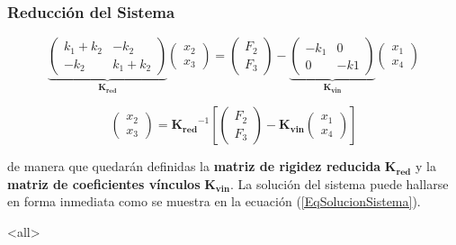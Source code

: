   \begin{frame}[label=FrameSistemaReducido]
    \frametitle<presentation>{Reducción del Sistema}
    \begin{equation}\label{EqSistemaReducido}
      \underbrace{
	\begin{pmatrix} k_1 + k_2 & - k_2 \\ -k_2 & k_1 + k_2 \end{pmatrix}
	}_{ \mathbf{K_{red} } }
	\begin{pmatrix}x_2 \\ x_3\end{pmatrix}
	  = 
	  \begin{pmatrix}F_2 \\ F_3\end{pmatrix}
	    -
	  \underbrace{
	      \begin{pmatrix} -k_1 & 0 \\ 0 & -k1 \end{pmatrix}
	   }_{ \mathbf{ K_{vin} } }
	\begin{pmatrix}x_1 \\ x_4\end{pmatrix}
    \end{equation}

    \begin{equation} \label{EqSolucionSistema}
      \begin{pmatrix} x_2 \\ x_3  \end{pmatrix}
	=
	\mathbf{K_{red}} ^{-1} 
	\left[
      \begin{pmatrix} F_2 \\ F_3  \end{pmatrix}
	- 
	\mathbf{ K_{vin} }
      \begin{pmatrix} x_1 \\ x_4  \end{pmatrix}
	\right]
    \end{equation}

  \end{frame}


de manera que quedarán definidas la \textbf{matriz de rigidez reducida} $\mathbf{K_{red} }$ y la
\textbf{matriz de coeficientes vínculos} $\mathbf{K_{vin}}$. La solución del sistema puede
hallarse en forma inmediata como se muestra en la ecuación (\ref{EqSolucionSistema}).

\mode*

\mode<all>
